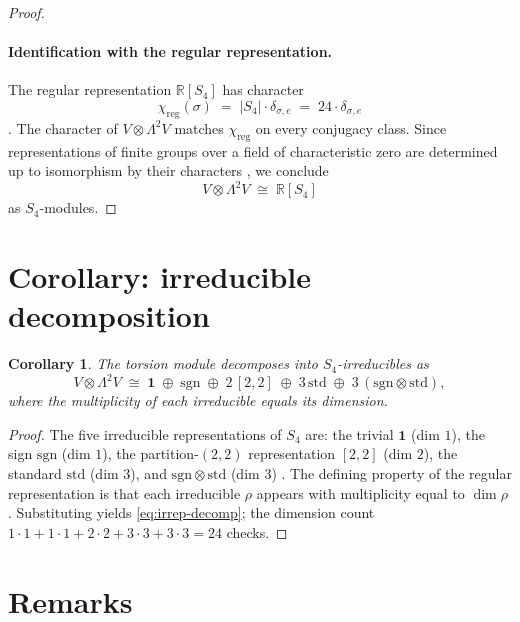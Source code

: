 \documentclass[11pt]{article}
\theoremstyle{plain}
\newtheorem{corollary}[theorem]{Corollary}
\theoremstyle{remark}
\begin{document}
\begin{proof}
\paragraph{Identification with the regular representation.}
The regular representation $\mathbb{R}[S_4]$ has character
\begin{equation}
\chi_{\mathrm{reg}}(\sigma) \;=\; |S_4|\cdot \delta_{\sigma, e} \;=\; 24 \cdot \delta_{\sigma, e}
\label{eq:reg-character}
\end{equation}
\cite[\S 2.4, Prop.~5]{Serre1977}. The character of $V \otimes \Lambda^2 V$ matches $\chi_{\mathrm{reg}}$ on every conjugacy class. Since representations of finite groups over a field of characteristic zero are determined up to isomorphism by their characters \cite[\S 2.3, Cor.~2]{Serre1977}, we conclude
\[
V \otimes \Lambda^2 V \;\cong\; \mathbb{R}[S_4]
\]
as $S_4$-modules. \qedhere
\end{proof}

\section{Corollary: irreducible decomposition}

\begin{corollary}\label{cor:decomp}
The torsion module decomposes into $S_4$-irreducibles as
\begin{equation}
V \otimes \Lambda^2 V \;\cong\; \mathbf{1} \;\oplus\; \mathrm{sgn} \;\oplus\; 2\,[2,2] \;\oplus\; 3\,\mathrm{std} \;\oplus\; 3\,(\mathrm{sgn} \otimes \mathrm{std}),
\label{eq:irrep-decomp}
\end{equation}
where the multiplicity of each irreducible equals its dimension.
\end{corollary}

\begin{proof}
The five irreducible representations of $S_4$ are: the trivial $\mathbf{1}$ (dim $1$), the sign $\mathrm{sgn}$ (dim $1$), the partition-$(2,2)$ representation $[2,2]$ (dim $2$), the standard $\mathrm{std}$ (dim $3$), and $\mathrm{sgn} \otimes \mathrm{std}$ (dim $3$) \cite[\S 2.3]{FultonHarris}. The defining property of the regular representation is that each irreducible $\rho$ appears with multiplicity equal to $\dim \rho$ \cite[\S 2.4, Cor.~1]{Serre1977}. Substituting yields \eqref{eq:irrep-decomp}; the dimension count $1\cdot 1 + 1\cdot 1 + 2\cdot 2 + 3\cdot 3 + 3\cdot 3 = 24$ checks. \qedhere
\end{proof}

\section{Remarks}
\end{document}
